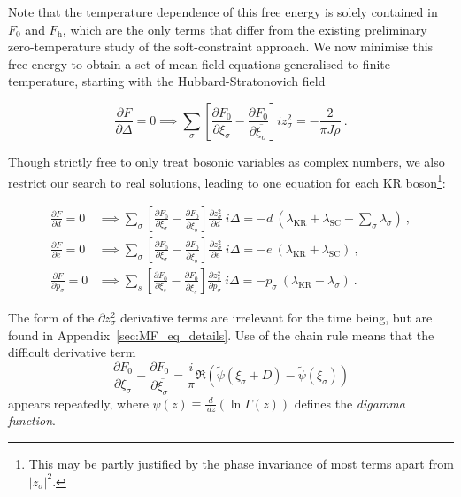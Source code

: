 \documentclass[12pt]{article}
\begin{document}

Note that the temperature dependence of this free energy is solely contained in $ F_0 $ and $ F_{\text{h}} $, which are the only terms that differ from the existing preliminary zero-temperature study of the soft-constraint approach. We now minimise this free energy to obtain a set of mean-field equations generalised to finite temperature, starting with the Hubbard-Stratonovich field

\begin{equation}
\frac{\partial F}{\partial \Delta} = 0 \implies \sum_{\sigma} \left[ \frac{\partial F_{0}}{\partial \xi_{\sigma}} - \frac{\partial F_{0}}{\partial \overline{\xi_{\sigma}}} \right] i z^2_{\sigma} = - \frac{2}{\pi J \rho} ~ .
\label{eq:MF_delta}
\end{equation}

Though strictly free to only treat bosonic variables as complex numbers, we also restrict our search to real solutions, leading to one equation for each KR boson\footnote{This may be partly justified by the phase invariance of most terms apart from $ | z_{\sigma} |^2 $.}: %

\begin{align}
\frac{\partial F}{\partial d} = 0 &\implies \sum_{\sigma} \left[ \frac{\partial F_{0}}{\partial \xi_{\sigma}} - \frac{\partial F_{0}}{\partial \overline{\xi_{\sigma}}} \right] \frac{\partial z^2_{\sigma}}{\partial d} ~ i \Delta = -d ~ ( \lambda_{\text{KR}} + \lambda_{\text{SC}} -  \sum_{\sigma} \lambda_{\sigma} ) ~ , \label{eq:MF_d} \\
\frac{\partial F}{\partial e} = 0 &\implies \sum_{\sigma} \left[ \frac{\partial F_{0}}{\partial \xi_{\sigma}} - \frac{\partial F_{0}}{\partial \overline{\xi_{\sigma}}} \right] \frac{\partial z^2_{\sigma}}{\partial e} ~ i \Delta = -e ~ ( \lambda_{\text{KR}} + \lambda_{\text{SC}} ) ~ , \label{eq:MF_e} \\
\frac{\partial F}{\partial p_{\sigma}} = 0 &\implies \sum_{s} \left[ \frac{\partial F_{0}}{\partial \xi_{s}} - \frac{\partial F_{0}}{\partial \overline{\xi_{s}}} \right] \frac{\partial z^2_{s}}{\partial p_{\sigma}} ~ i \Delta = - p_{\sigma} ~ (\lambda_{\text{KR}} - \lambda_{\sigma}) ~ . \label{eq:MF_p}
\end{align}

The form of the $ \partial z^2_{\sigma} $ derivative terms are irrelevant for the time being, but are found in Appendix~\ref{sec:MF_eq_details}. Use of the chain rule means that the difficult derivative term
\begin{equation}
\frac{\partial F_{0}}{\partial \xi_{\sigma}} - \frac{\partial F_{0}}{\partial \overline{\xi_{\sigma}}} = \frac{i}{\pi} \Re{( \widetilde{\psi}(\xi_{\sigma} + D) - \widetilde{\psi}(\xi_{\sigma}))}
\end{equation}
appears repeatedly, where $ \psi(z) \equiv \frac{d}{\,dz}(\ln{\Gamma(z)}) $ defines the \textit{digamma function}.
\end{document}
